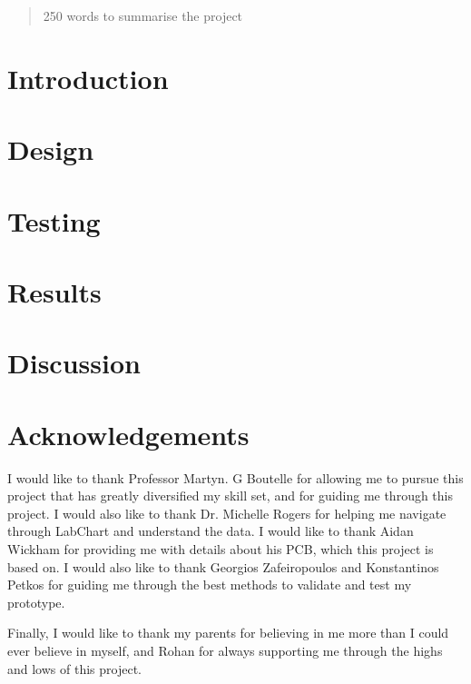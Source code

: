 \documentclass[12pt,twoside]{article}
\begin{document}


\begin{abstract}
    250 words to summarise the project
    
\end{abstract}

\newpage


\section{Introduction}


\section{Design}


\section{Testing}


\section{Results}


\section{Discussion}



\section{Acknowledgements}
I would like to thank Professor Martyn. G Boutelle for allowing me to pursue this project that has greatly diversified my skill set, and for guiding me through this project. I would also like to thank Dr. Michelle Rogers for helping me navigate through LabChart and understand the data. I would like to thank Aidan Wickham for providing me with details about his PCB, which this project is based on. I would also like to thank Georgios Zafeiropoulos and Konstantinos Petkos for guiding me through the best methods to validate and test my prototype. 

Finally, I would like to thank my parents for believing in me more than I could ever believe in myself, and Rohan for always supporting me through the highs and lows of this project.

\newpage


\end{document}
